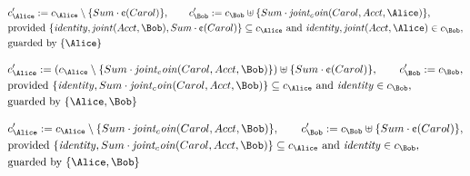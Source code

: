 \begin{align*}
&
c'_
{
\Alice
}
 := 
c_
{
\Alice
}
 \setminus 
\{
Sum
\cdot
\text{\textcent}
(
Carol
)
\}
, \qquad 
c'_
{
\Bob
}
 := 
c_
{
\Bob
}
 \uplus 
\{
Sum
\cdot
\mathit{
joint_coin
}
(
Carol
,
Acct
,
\Alice
)
\}
,\\
&
\text{provided } 
\{
\mathit{
identity
}
,
\mathit{
joint
}
(
Acct
,
\Bob
)
,
Sum
\cdot
\text{\textcent}
(
Carol
)
\}
 \subseteq c_
{
\Alice
}
 \text{ and } 
\mathit{
identity
}
,
\mathit{
joint
}
(
Acct
,
\Alice
)
 \in c_
{
\Bob
}
,\\
&
\text{guarded by } \{
\Alice
\}
\end{align*}

\begin{align*}
&
c'_
{
\Alice
}
 := 
(c_
{
\Alice
}
 \setminus 
\{
Sum
\cdot
\mathit{
joint_coin
}
(
Carol
,
Acct
,
\Bob
)
\}
) \uplus 
\{
Sum
\cdot
\text{\textcent}
(
Carol
)
\}
, \qquad 
c'_
{
\Bob
}
 := 
c_
{
\Bob
}
,\\
&
\text{provided } 
\{
\mathit{
identity
}
,
Sum
\cdot
\mathit{
joint_coin
}
(
Carol
,
Acct
,
\Bob
)
\}
 \subseteq c_
{
\Alice
}
 \text{ and } 
\mathit{
identity
}
 \in c_
{
\Bob
}
,\\
&
\text{guarded by } \{
\Alice
,
\Bob
\}
\end{align*}

\begin{align*}
&
c'_
{
\Alice
}
 := 
c_
{
\Alice
}
 \setminus 
\{
Sum
\cdot
\mathit{
joint_coin
}
(
Carol
,
Acct
,
\Bob
)
\}
, \qquad 
c'_
{
\Bob
}
 := 
c_
{
\Bob
}
 \uplus 
\{
Sum
\cdot
\text{\textcent}
(
Carol
)
\}
,\\
&
\text{provided } 
\{
\mathit{
identity
}
,
Sum
\cdot
\mathit{
joint_coin
}
(
Carol
,
Acct
,
\Bob
)
\}
 \subseteq c_
{
\Alice
}
 \text{ and } 
\mathit{
identity
}
 \in c_
{
\Bob
}
,\\
&
\text{guarded by } \{
\Alice
,
\Bob
\}
\end{align*}
